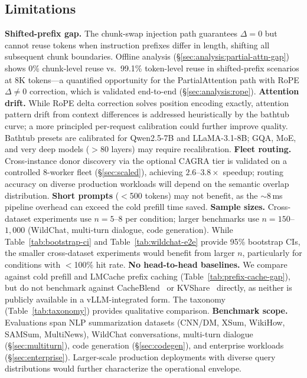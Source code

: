 \documentclass[10pt,twocolumn]{article}
\begin{document}
\subsection{Limitations}\label{sec:limitations}
\textbf{Shifted-prefix gap.}
The chunk-swap injection path guarantees $\Delta{=}0$ but cannot reuse
tokens when instruction prefixes differ in length, shifting all
subsequent chunk boundaries. Offline analysis
(\S\ref{sec:analysis:partial-attn-gap}) shows 0\% chunk-level reuse
vs.\ 99.1\% token-level reuse in shifted-prefix scenarios at 8K tokens---a
quantified opportunity for the PartialAttention path with RoPE $\Delta{\neq}0$
correction, which is validated end-to-end (\S\ref{sec:analysis:rope}).
\textbf{Attention drift.}
While RoPE delta correction solves position encoding exactly, attention
pattern drift from context differences is addressed heuristically by
the bathtub curve; a more principled per-request calibration could
further improve quality. Bathtub presets are calibrated for Qwen2.5-7B
and LLaMA-3.1-8B; GQA, MoE, and very deep models ($>$80 layers) may
require recalibration.
\textbf{Fleet routing.}
Cross-instance donor discovery via the optional CAGRA tier is validated on
a controlled 8-worker fleet (\S\ref{sec:scaled}), achieving $2.6$--$3.8\times$
speedup; routing accuracy on diverse production workloads will depend on
the semantic overlap distribution.
\textbf{Short prompts} ($<$500 tokens) may not benefit, as the
${\sim}8$\,ms pipeline overhead can exceed the cold prefill time saved.
\textbf{Sample sizes.} Cross-dataset experiments use $n{=}5$--$8$
per condition; larger benchmarks use $n{=}150$--$1{,}000$ (WildChat,
multi-turn dialogue, code generation). While
Table~\ref{tab:bootstrap-ci} and Table~\ref{tab:wildchat-e2e} provide
95\% bootstrap CIs, the smaller cross-dataset experiments would benefit
from larger $n$, particularly for conditions with $<$100\% hit rate.
\textbf{No head-to-head baselines.} We compare against cold prefill
and LMCache prefix caching (Table~\ref{tab:prefix-cache-gap}), but
do not benchmark against CacheBlend~\cite{cacheblend} or
KVShare~\cite{kvshare} directly, as neither is publicly available
in a vLLM-integrated form. The taxonomy
(Table~\ref{tab:taxonomy}) provides qualitative comparison.
\textbf{Benchmark scope.} Evaluations span NLP summarization
datasets (CNN/DM, XSum, WikiHow, SAMSum, MultiNews), WildChat
conversations, multi-turn dialogue (\S\ref{sec:multiturn}), code
generation (\S\ref{sec:codegen}), and enterprise workloads
(\S\ref{sec:enterprise}). Larger-scale production deployments with
diverse query distributions would further characterize the
operational envelope.
\end{document}
